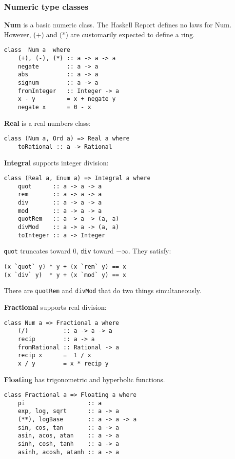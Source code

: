 %

\subsubsection{Numeric type classes}
\textbf{Num} is a basic numeric class.
The Haskell Report defines no laws for Num.
However, (+) and (*) are customarily expected to define a ring.
\begin{verbatim}
class  Num a  where
    (+), (-), (*) :: a -> a -> a
    negate        :: a -> a
    abs           :: a -> a
    signum        :: a -> a
    fromInteger   :: Integer -> a
    x - y         = x + negate y
    negate x      = 0 - x
\end{verbatim}

\textbf{Real} is a real numbers class:
\begin{verbatim}
class (Num a, Ord a) => Real a where
    toRational :: a -> Rational 
\end{verbatim}

\textbf{Integral} supports integer division:
\begin{verbatim}
class (Real a, Enum a) => Integral a where
    quot      :: a -> a -> a
    rem       :: a -> a -> a
    div       :: a -> a -> a
    mod       :: a -> a -> a
    quotRem   :: a -> a -> (a, a) 
    divMod    :: a -> a -> (a, a) 
    toInteger :: a -> Integer 
\end{verbatim}

\texttt{quot} truncates toward $0$, \texttt{div} toward $-\infty$.
They satisfy:
\begin{verbatim}
(x `quot` y) * y + (x `rem` y) == x
(x `div` y)  * y + (x `mod` y) == x
\end{verbatim}

There are \texttt{quotRem} and \texttt{divMod} that do two things simultaneously.

\textbf{Fractional} supports real division:
\begin{verbatim}
class Num a => Fractional a where
    (/)          :: a -> a -> a
    recip        :: a -> a
    fromRational :: Rational -> a
    recip x      =  1 / x
    x / y        = x * recip y
\end{verbatim}

\textbf{Floating} has trigonometric and hyperbolic functions.
\begin{verbatim}
class Fractional a => Floating a where
    pi                  :: a
    exp, log, sqrt      :: a -> a
    (**), logBase       :: a -> a -> a
    sin, cos, tan       :: a -> a
    asin, acos, atan    :: a -> a
    sinh, cosh, tanh    :: a -> a
    asinh, acosh, atanh :: a -> a
\end{verbatim}

